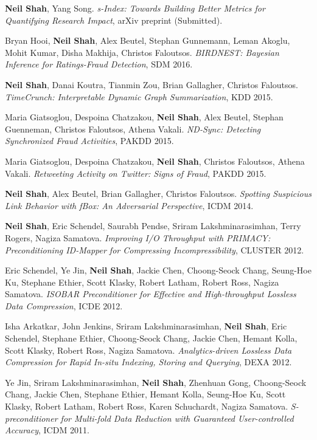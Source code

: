 \documentclass{article}
\begin{document}
\begin{etaremune}[itemsep=1pt,parsep=0pt]
\item {\bf Neil Shah}, Yang Song. \emph{s-Index: Towards Building Better Metrics for Quantifying Research Impact}, arXiv preprint (Submitted).

\item Bryan Hooi, {\bf Neil Shah}, Alex Beutel, Stephan Gunnemann, Leman Akoglu, Mohit Kumar, Disha Makhija, Christos Faloutsos. \emph{BIRDNEST: Bayesian Inference for Ratings-Fraud Detection}, SDM 2016.

\item {\bf Neil Shah}, Danai Koutra, Tianmin Zou, Brian Gallagher, Christos Faloutsos. \emph{TimeCrunch: Interpretable Dynamic Graph Summarization}, KDD 2015.

\item Maria Giatsoglou, Despoina Chatzakou, {\bf Neil Shah}, Alex Beutel, Stephan Guenneman, Christos Faloutsos, Athena Vakali. \emph{ND-Sync: Detecting Synchronized Fraud Activities}, PAKDD 2015.

\item Maria Giatsoglou, Despoina Chatzakou, {\bf Neil Shah}, Christos Faloutsos, Athena Vakali. \emph{Retweeting Activity on Twitter: Signs of Fraud}, PAKDD 2015.

\item {\bf Neil Shah}, Alex Beutel, Brian Gallagher, Christos Faloutsos. \emph{Spotting Suspicious Link Behavior with fBox: An Adversarial Perspective}, ICDM 2014.

\item {\bf Neil Shah}, Eric Schendel, Saurabh Pendse, Sriram Lakshminarasimhan, Terry Rogers, Nagiza Samatova. \emph{Improving I/O Throughput with PRIMACY: Preconditioning ID-Mapper for Compressing Incompressibility}, CLUSTER 2012.

\item Eric Schendel, Ye Jin, {\bf Neil Shah}, Jackie Chen, Choong-Seock Chang, Seung-Hoe Ku, Stephane Ethier, Scott Klasky, Robert Latham, Robert Ross, Nagiza Samatova. \emph{ISOBAR Preconditioner for Effective and High-throughput Lossless Data Compression}, ICDE 2012.

\item Isha Arkatkar, John Jenkins, Sriram Lakshminarasimhan, {\bf Neil Shah}, Eric Schendel, Stephane Ethier, Choong-Seock Chang, Jackie Chen, Hemant Kolla, Scott Klasky, Robert Ross, Nagiza Samatova. \emph{Analytics-driven Lossless Data Compression for Rapid In-situ Indexing, Storing and Querying}, DEXA 2012.

\item Ye Jin, Sriram Lakshminarasimhan, {\bf Neil Shah}, Zhenhuan Gong, Choong-Seock Chang, Jackie Chen, Stephane Ethier, Hemant Kolla, Seung-Hoe Ku, Scott Klasky, Robert Latham, Robert Ross, Karen Schuchardt, Nagiza Samatova. \emph{S-preconditioner for Multi-fold Data Reduction with Guaranteed User-controlled Accuracy}, ICDM 2011.


\end{etaremune}
\end{document}
